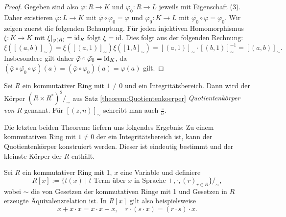 \begin{proof}
    Gegeben sind also $\varphi:R\to K$ und $\varphi_0:R\to L$ jeweils mit Eigenschaft (3).
    Daher existieren $\bar{\varphi}:L\to K$ mit $\bar{\varphi}\circ \varphi_0=\varphi$ und ${\varphi_0}:K\to L$
    mit $\bar{\varphi_0}\circ \varphi=\varphi_0$.
    Wir zeigen zuerst die folgenden Behauptung. Für jeden injektiven Homomorphismus
    $\xi:K\to K$ mit $\xi|_{\varphi(R)}=\operatorname{id}_R$ folgt $\xi=\operatorname{id}$. Dies folgt aus der folgenden Rechnung:
    $$
        \xi([(a,b)]_\sim)=\xi([(a,1)]_\sim)\xi([1,b]_\sim)=[(a,1)]_\sim\cdot [(b,1)]_\sim^{-1}=[(a,b)]_\sim.
    $$
    Insbesondere gilt daher $\bar{\varphi}\circ \bar{\varphi_0}=\operatorname{id}_K$, da $(\bar{\varphi}\circ\bar{\varphi_0}\circ\varphi)(a)=(\bar{\varphi}\circ\varphi_0)(a)=\varphi(a)$ gilt.
\end{proof}

\begin{definition}
    Sei $R$ ein kommutativer Ring mit $1\neq 0$ und ein Integritätsbereich. Dann wird der Körper
    $(R\times R^*)^2/_\sim$ aus Satz \ref{theorem:Quotientenkoerper} \emph{Quotientenk\"orper von $R$} genannt.
    Für $[(z,n)]_\sim$ schreibt man auch $\frac{z}{n}$.
\end{definition}

\begin{remark}
    Die letzten beiden Theoreme liefern uns folgendes Ergebnis: Zu einem kommutativen Ring mit $1\neq 0$ der ein Integritätsbereich
    ist, kann der Quotientenk\"orper konstruiert werden. Dieser ist eindeutig bestimmt und der kleinste Körper
    der $R$ enthält.
\end{remark}

\begin{example}
    Sei $R$ ein kommutativer Ring mit 1, $x$ eine Variable und definiere
    $$ R[x] := \{ t(x) \mid t \text{ Term über $x$ in Sprache } +, \cdot, (r)_{r \in R} \}/_\sim, $$
    wobei $\sim$ die von Gesetzen der kommutativen Ringe mit 1 und Gesetzen in $R$ erzeugte Äquivalenzrelation ist. In $R[x]$ gilt also beispielsweise
    $$ x + x \cdot x = x \cdot x + x, \quad r \cdot (s \cdot x) = (r \cdot s) \cdot x. $$
\end{example}

